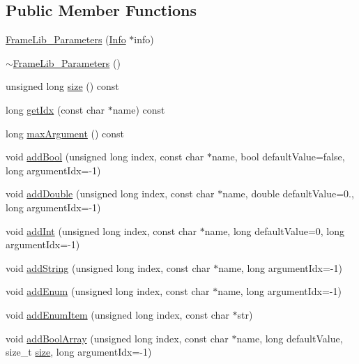 \subsection*{Public Member Functions}
\begin{DoxyCompactItemize}
\item 
\hyperlink{class_frame_lib___parameters_a901d16f8654b147d21cf2b87d3ed8a14}{Frame\+Lib\+\_\+\+Parameters} (\hyperlink{class_frame_lib___parameters_1_1_info}{Info} $\ast$info)
\item 
\hyperlink{class_frame_lib___parameters_a5bb469337e8a213ba9f397bc6af269c8}{$\sim$\+Frame\+Lib\+\_\+\+Parameters} ()
\item 
unsigned long \hyperlink{class_frame_lib___parameters_a391d0cb37c904981f7ad52bc0ba1b111}{size} () const
\item 
long \hyperlink{class_frame_lib___parameters_a6188f2b27de6850129ea084c99aa4669}{get\+Idx} (const char $\ast$name) const
\item 
long \hyperlink{class_frame_lib___parameters_a79b95cc8a0494356b12fa2ac51ece583}{max\+Argument} () const
\item 
void \hyperlink{class_frame_lib___parameters_ad975cc435f4fa2006e1a722dad784d9a}{add\+Bool} (unsigned long index, const char $\ast$name, bool default\+Value=false, long argument\+Idx=-\/1)
\item 
void \hyperlink{class_frame_lib___parameters_ab05bf4cd30eecd26bba972efd171798c}{add\+Double} (unsigned long index, const char $\ast$name, double default\+Value=0., long argument\+Idx=-\/1)
\item 
void \hyperlink{class_frame_lib___parameters_a9cb86d9fa829686a58e7776dcc45b60a}{add\+Int} (unsigned long index, const char $\ast$name, long default\+Value=0, long argument\+Idx=-\/1)
\item 
void \hyperlink{class_frame_lib___parameters_a54881a00c48e949914b130383c110a0a}{add\+String} (unsigned long index, const char $\ast$name, long argument\+Idx=-\/1)
\item 
void \hyperlink{class_frame_lib___parameters_ae79973b1261a0a63a14f6c4b299d0fb6}{add\+Enum} (unsigned long index, const char $\ast$name, long argument\+Idx=-\/1)
\item 
void \hyperlink{class_frame_lib___parameters_a9840a17de7f4c3078d26f23ec88eb02d}{add\+Enum\+Item} (unsigned long index, const char $\ast$str)
\item 
void \hyperlink{class_frame_lib___parameters_a9239184fd366b1cbaeec545577c20ab2}{add\+Bool\+Array} (unsigned long index, const char $\ast$name, long default\+Value, size\+\_\+t \hyperlink{class_frame_lib___parameters_a391d0cb37c904981f7ad52bc0ba1b111}{size}, long argument\+Idx=-\/1)

\end{DoxyCompactItemize}
